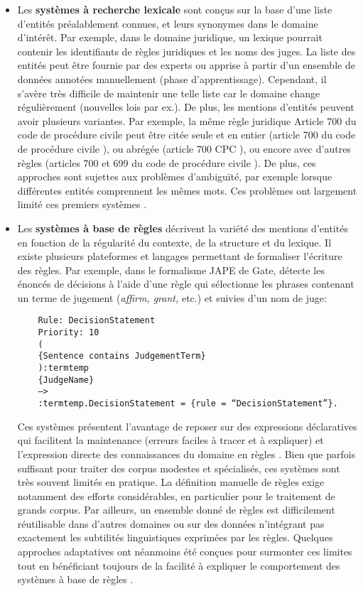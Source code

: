 \begin{itemize}
\item Les \textbf{systèmes à recherche lexicale} sont conçus sur la base d'une liste d'entités préalablement connues, et leurs synonymes dans le domaine d'intérêt. Par exemple, dans le domaine juridique, un lexique pourrait contenir les identifiants de règles juridiques et les noms des juges. La liste des entités peut être fournie par des experts ou apprise à partir d'un ensemble de données annotées manuellement (phase d'apprentissage). Cependant, il s'avère très difficile de maintenir une telle liste car le domaine change régulièrement (nouvelles lois par ex.). De plus, les mentions d'entités peuvent avoir plusieurs variantes. Par exemple, la même règle juridique \og Article 700 du code de procédure civile \fg{} peut être citée seule et en entier (\og article 700 du code de procédure civile \fg{}), ou abrégée (\og article 700 CPC \fg{}), ou encore avec d'autres règles (\og articles 700 et 699 du code de procédure civile \fg{}). De plus, ces approches sont sujettes aux problèmes d'ambiguïté, par exemple lorsque différentes entités comprennent les mêmes mots. Ces problèmes ont largement limité ces premiers systèmes \citep{palmer1997learnedLookup}.

\item Les \textbf{systèmes à base de règles} décrivent la variété des mentions d'entités en fonction de la régularité du contexte, de la structure et du lexique. Il existe plusieurs plateformes et langages permettant de formaliser l'écriture des règles. Par exemple, dans le formalisme JAPE de Gate, \citet{wyner2010extractlegalelts} détecte les énoncés de décisions à l'aide d'une règle qui sélectionne les phrases contenant un terme de jugement (\textit{affirm, grant,} etc.) et suivies d'un nom de juge:

\begin{verbatim}
	Rule: DecisionStatement
	Priority: 10
	(
	{Sentence contains JudgementTerm}
	):termtemp
	{JudgeName}
	–>
	:termtemp.DecisionStatement = {rule = “DecisionStatement”}.
\end{verbatim}

 Ces systèmes présentent l'avantage de reposer sur des expressions déclaratives qui facilitent la maintenance (erreurs faciles à tracer et à expliquer) et l'expression directe des connaissances du domaine en règles \citep{waltl2018ruleiesurvey}. Bien que parfois suffisant pour traiter des corpus modestes et spécialisés, ces systèmes sont très souvent limités en pratique. La définition manuelle de règles exige notamment des efforts considérables, en particulier pour le traitement de grands corpus. Par ailleurs, un ensemble donné de règles est difficilement réutilisable dans d'autres domaines ou sur des données n'intégrant pas exactement les subtilités linguistiques exprimées par les règles. Quelques approches adaptatives ont néanmoins été conçues pour surmonter ces limites tout en bénéficiant toujours de la facilité à expliquer le comportement des systèmes à base de règles \citep{siniakov2008gropusrulebased,chiticariu2010adaptativerulebased}.


\end{itemize}
